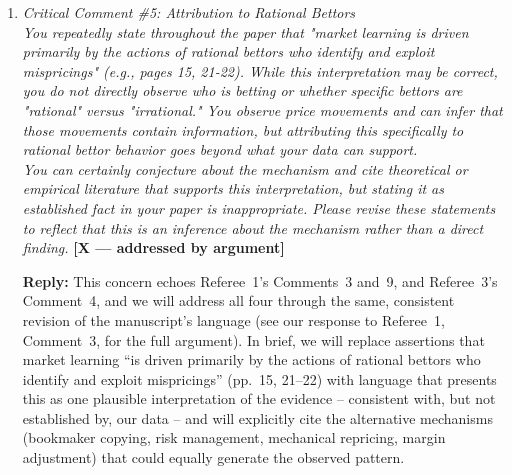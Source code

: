 \documentclass[letterpaper,12pt]{article}
\newcounter{b}
\newcommand{\argX}{\textcolor{green!55!black}{\textbf{[X --- addressed by argument]}}}
\newcommand{\Reply}[1]{\par\noindent\textbf{Reply:} #1}
\begin{document}
\begin{enumerate}
\Reply{We agree that price movements from open to close can reflect either the correction of an initial mispricing or the rational incorporation of genuinely new information arriving during the betting window, and that our current language does not always distinguish these possibilities. We will revise the relevant passages -- including the discussion of Equation~3, Tables~5--6, and the statement on p.~15 that ``the market identifies both under- and overvalued players'' -- to explicitly acknowledge the alternative explanation, particularly for the subset of matches with large price movements (exceeding roughly 10--15\% in implied probability) where genuine news is more plausible. We will retain our argument, already made in the Discussion (Section~6), that tennis is comparatively well suited to isolating mispricing-correction from information-arrival relative to team sports, because outcomes hinge on fewer discrete, newsworthy pre-match events (e.g., lineup changes); but we agree the paper should more carefully separate what is directly observed (price movements predict outcomes) from what is inferred (the mechanism generating those movements), and will adjust our language throughout accordingly.}

\item \textit{Critical Comment \#5: Attribution to Rational Bettors\\[6pt]
You repeatedly state throughout the paper that "market learning is driven primarily by the actions of rational bettors who identify and exploit mispricings" (e.g., pages 15, 21-22). While this interpretation may be correct, you do not directly observe who is betting or whether specific bettors are "rational" versus "irrational." You observe price movements and can infer that those movements contain information, but attributing this specifically to rational bettor behavior goes beyond what your data can support.\\[6pt]
You can certainly conjecture about the mechanism and cite theoretical or empirical literature that supports this interpretation, but stating it as established fact in your paper is inappropriate. Please revise these statements to reflect that this is an inference about the mechanism rather than a direct finding.} \argX

\Reply{This concern echoes Referee~1's Comments~3 and~9, and Referee~3's Comment~4, and we will address all four through the same, consistent revision of the manuscript's language (see our response to Referee~1, Comment~3, for the full argument). In brief, we will replace assertions that market learning ``is driven primarily by the actions of rational bettors who identify and exploit mispricings'' (pp.~15, 21--22) with language that presents this as one plausible interpretation of the evidence -- consistent with, but not established by, our data -- and will explicitly cite the alternative mechanisms (bookmaker copying, risk management, mechanical repricing, margin adjustment) that could equally generate the observed pattern.}


\end{enumerate}
\end{document}
